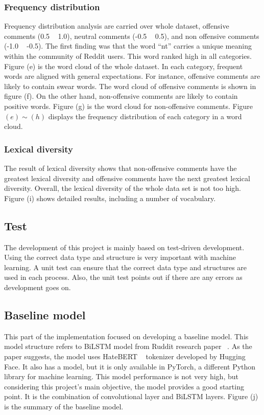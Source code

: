 \documentclass[11pt, natbib=false]{article}
\begin{document}
\subsubsection{Frequency distribution}
Frequency distribution analysis are carried over whole dataset, offensive comments (0.5 ~ 1.0), neutral comments (-0.5 ~ 0.5), and non offensive comments (-1.0 ~ -0.5).
The first finding was that the word “nt” carries a unique meaning within the community of Reddit users.
This word ranked high in all categories. Figure (e) is the word cloud of the whole dataset.
In each category, frequent words are aligned with general expectations.
For instance, offensive comments are likely to contain swear words. The word cloud of offensive comments is shown in figure (f).
On the other hand, non-offensive comments are likely to contain positive words. Figure (g) is the word cloud for non-offensive comments.
Figure $ (e) \sim (h)$ displays the frequency distribution of each category in a word cloud.

\subsubsection{Lexical diversity}
The result of lexical diversity shows that non-offensive comments have the greatest lexical diversity and offensive comments have the next greatest lexical diversity.
Overall, the lexical diversity of the whole data set is not too high.
Figure (i) shows detailed results, including a number of vocabulary.

\subsection{Test}
The development of this project is mainly based on test-driven development.
Using the correct data type and structure is very important with machine learning.
A unit test can ensure that the correct data type and structures are used in each process.
Also, the unit test points out if there are any errors as development goes on.

\subsection{Baseline model}
This part of the implementation focused on developing a baseline model.
This model structure refers to BiLSTM model from Ruddit research paper ~\cite{hada2021ruddit}.
As the paper suggests, the model uses HateBERT ~\cite{caselli2020hatebert} tokenizer developed by Hugging Face.
It also has a model, but it is only available in PyTorch, a different Python library for machine learning.
This model performance is not very high, but considering this project's main objective, the model provides a good starting point.
It is the combination of convolutional layer and BiLSTM layers.
Figure (j) is the summary of the baseline model.
\end{document}
